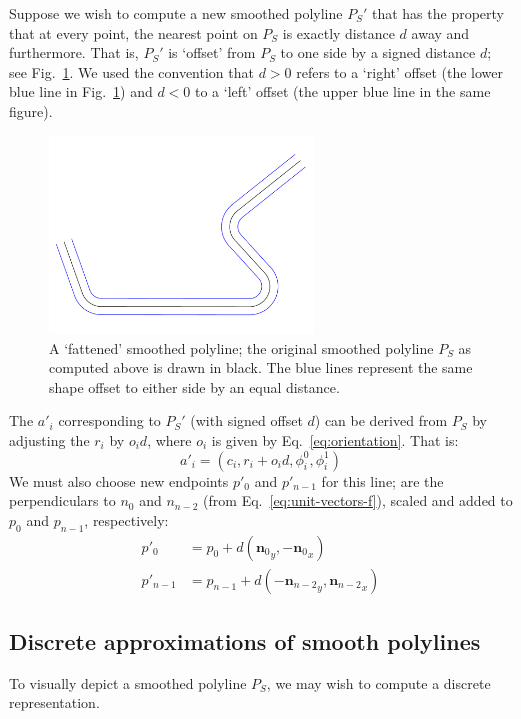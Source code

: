 \documentclass{article}
\begin{document}
Suppose we wish to compute a new smoothed polyline $P_S'$ that has the property that at every point, the nearest point on $P_S$ is exactly distance $d$ away and furthermore.  That is, $P_S'$ is `offset' from $P_S$ to one side by a signed distance $d$; see Fig.~\ref{fig:fattened-polyline}.  We used the convention that $d>0$ refers to a `right' offset (the lower blue line in Fig.~\ref{fig:fattened-polyline}) and $d<0$ to a `left' offset (the upper blue line in the same figure).
%
\begin{figure}[h]
  \centering
  \includegraphics[width=7cm]{5}
  \caption{A `fattened' smoothed polyline; the original smoothed polyline $P_S$ as computed above is drawn in black.  The blue lines represent the same shape offset to either side by an equal distance.}
  \label{fig:fattened-polyline}
\end{figure}
%
The $a'_i$ corresponding to $P_S'$ (with signed offset $d$) can be derived from $P_S$ by adjusting the $r_i$ by $o_id$, where $o_i$ is given by Eq.~\eqref{eq:orientation}.  That is:
%
\begin{equation}
  \label{eq:arc-offset}
  a'_i = \left(c_i, r_i + o_id, \phi^0_i, \phi^1_i\right)
\end{equation}
%
We must also choose new endpoints $p'_0$ and $p'_{n-1}$ for this line;  are the perpendiculars to $n_0$ and $n_{n-2}$ (from Eq.~\eqref{eq:unit-vectors-f}), scaled and added to $p_0$ and $p_{n-1}$, respectively:
%
\begin{align}
  \label{eq:endpoints-prime}
  p'_0 &= p_0 + d \left({\mathbf{n}_0}_y, -{\mathbf{n}_0}_x\right)\\
  p'_{n-1} &= p_{n-1} + d \left(-{\mathbf{n}_{n-2}}_y, {\mathbf{n}_{n-2}}_x\right)
\end{align}
%
\subsection{Discrete approximations of smooth polylines}
%
To visually depict a smoothed polyline $P_S$, we may wish to compute a discrete representation.
%
\end{document}

